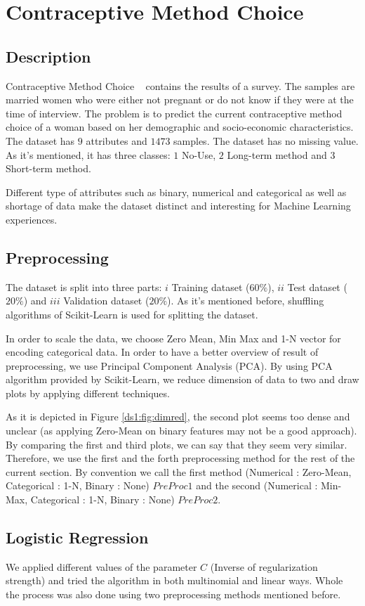 \section{Contraceptive Method Choice}
\label{db:sec:ds1}
\subsection{Description}
Contraceptive Method Choice ~\cite{ds1:uci} contains the results of a survey. The samples are married women who were either not pregnant or do not know if they were at the time of interview. The problem is to predict the current contraceptive method choice of a woman based on her demographic and socio-economic characteristics. The dataset has $9$ attributes and $1473$ samples. The dataset has no missing value. As it's mentioned, it has three classes: $1$ No-Use, $2$ Long-term method and $3$ Short-term method.

Different type of attributes such as binary, numerical and categorical as well as shortage of data make the dataset distinct and interesting for Machine Learning experiences.

\subsection{Preprocessing}
The dataset is split into three parts: $i$ Training dataset ($60\%$), $ii$ Test dataset ($20\%$) and $iii$ Validation dataset ($20\%$). As it's mentioned before, shuffling algorithms of Scikit-Learn is used for splitting the dataset.

In order to scale the data, we choose Zero Mean, Min Max and 1-N vector for encoding categorical data. In order to have a better overview of result of preprocessing, we use Principal Component Analysis (PCA). By using PCA algorithm provided by Scikit-Learn, we reduce dimension of data to two and draw plots by applying different techniques. 

As it is depicted in Figure \ref{ds1:fig:dimred}, the second plot seems too dense and unclear (as applying Zero-Mean on binary features may not be a good approach). By comparing the first and third plots, we can say that they seem very similar. Therefore, we use the first and the forth preprocessing method for the rest of the current section. By convention we call the first method (Numerical : Zero-Mean, Categorical : 1-N, Binary : None) $PreProc1$ and the second (Numerical : Min-Max, Categorical : 1-N, Binary : None) $PreProc2$.


\subsection{Logistic Regression}
We applied different values of the parameter $C$ (Inverse of regularization strength) and tried the algorithm in both multinomial and linear ways. Whole the process was also done using two preprocessing methods mentioned before.

